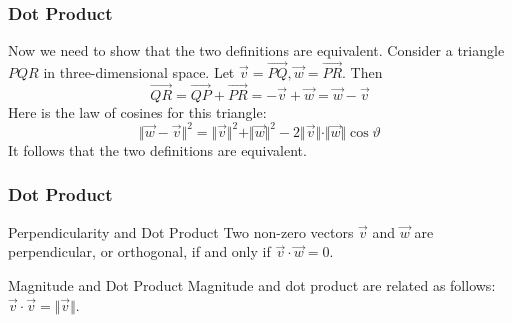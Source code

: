 \documentclass[xcolor=dvipsnames]{beamer}
\begin{document}
\begin{frame}
  \frametitle{Dot Product}
  Now we need to show that the two definitions are equivalent.
  Consider a triangle $PQR$ in three-dimensional space. Let
  $\vec{v}=\vec{PQ},\vec{w}=\vec{PR}$. Then
  \begin{equation}
    \label{eq:oobeipho}
  \vec{QR}=\vec{QP}+\vec{PR}=-\vec{v}+\vec{w}=\vec{w}-\vec{v}  
\end{equation}
Here is the law of cosines for this triangle:
\begin{equation}
  \label{eq:aiwahzoa}
  \Vert\vec{w}-\vec{v}\Vert^{2}=\Vert\vec{v}\Vert^{2}+\Vert\vec{w}\Vert^{2}-2\Vert\vec{v}\Vert\cdot\Vert\vec{w}\Vert\cos\vartheta
\end{equation}
It follows that the two definitions are equivalent.
\end{frame}

\begin{frame}
  \frametitle{Dot Product}
\begin{block}{Perpendicularity and Dot Product}
  Two non-zero vectors $\vec{v}$ and $\vec{w}$ are perpendicular, or
  orthogonal, if and only if $\vec{v}\cdot\vec{w}=0$.
\end{block}

\bigskip

\begin{block}{Magnitude and Dot Product}
  Magnitude and dot product are related as follows: $\vec{v}\cdot\vec{v}=\Vert\vec{v}\Vert$.
\end{block}
\end{frame}

\end{document}
